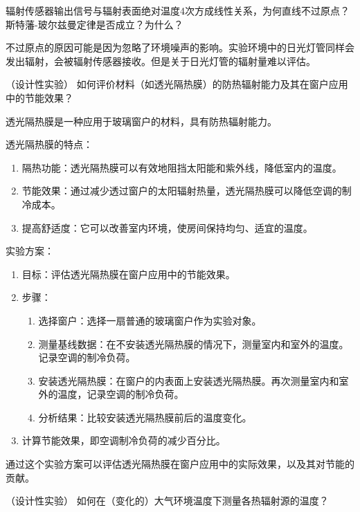 \documentclass[dvipsnames, svgnames,a4paper,11pt]{article}
\begin{document}
\begin{question}
	辐射传感器输出信号与辐射表面绝对温度4次方成线性关系，为何直线不过原点？斯特藩-玻尔兹曼定律是否成立？为什么？
\end{question}

	不过原点的原因可能是因为忽略了环境噪声的影响。实验环境中的日光灯管同样会发出辐射，会被辐射传感器接收。但是关于日光灯管的辐射量难以评估。



\begin{question}
	（设计性实验） 如何评价材料（如透光隔热膜）的防热辐射能力及其在窗户应用中的节能效果？
\end{question}

	透光隔热膜是一种应用于玻璃窗户的材料，具有防热辐射能力。

	透光隔热膜的特点：
	\begin{enumerate}
		\item 隔热功能：透光隔热膜可以有效地阻挡太阳能和紫外线，降低室内的温度。
		\item 节能效果：通过减少透过窗户的太阳辐射热量，透光隔热膜可以降低空调的制冷成本。
		\item 提高舒适度：它可以改善室内环境，使房间保持均匀、适宜的温度。
	\end{enumerate}
	
	实验方案：
	\begin{enumerate}
		\item 目标：评估透光隔热膜在窗户应用中的节能效果。
		\item 步骤：
			\begin{enumerate}[label=\roman*.]
				\item 选择窗户：选择一扇普通的玻璃窗户作为实验对象。
				\item 测量基线数据：在不安装透光隔热膜的情况下，测量室内和室外的温度。记录空调的制冷负荷。
				\item 安装透光隔热膜：在窗户的内表面上安装透光隔热膜。再次测量室内和室外的温度，记录空调的制冷负荷。
				\item 分析结果：比较安装透光隔热膜前后的温度变化。
			\end{enumerate}
	
		\item 计算节能效果，即空调制冷负荷的减少百分比。
	\end{enumerate}
	
	
	通过这个实验方案可以评估透光隔热膜在窗户应用中的实际效果，以及其对节能的贡献。

	
\begin{question}
	（设计性实验） 如何在（变化的）大气环境温度下测量各热辐射源的温度？
\end{question}
\end{document}
